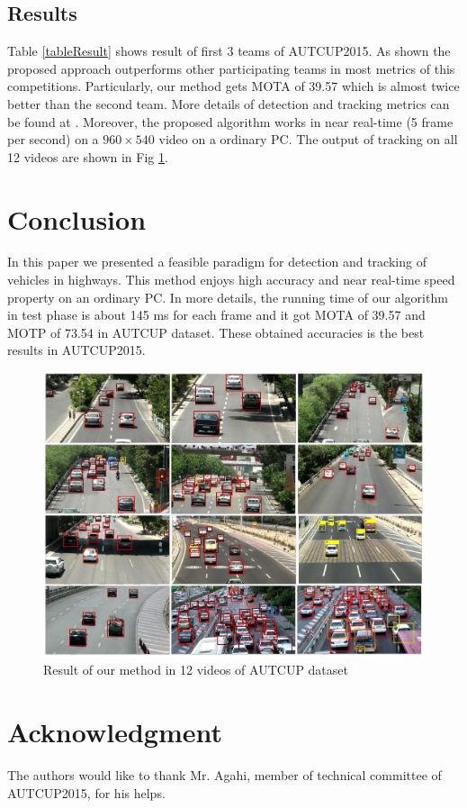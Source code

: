 \documentclass[conference]{IEEEtran}
\begin{document}
\subsection{Results} 
Table \ref{tableResult} shows result of first 3 teams of AUTCUP2015. As shown the proposed approach outperforms other participating teams in most metrics of this competitions. Particularly, our method gets MOTA of 39.57 which is almost twice better than the second team. More details of detection and tracking metrics can be found at \cite{}.
Moreover, the proposed algorithm works in near real-time (5 frame per second) on a $960\times 540$ video on a ordinary PC.
The output of tracking on all 12 videos are shown in Fig \ref{results}. 


\section{Conclusion}
In this paper we presented a feasible paradigm for detection and tracking of vehicles in highways. This method enjoys high accuracy and near real-time speed property on an ordinary PC. In more details, the running time of our algorithm in test phase is about 145 ms for each frame and it got MOTA of 39.57 and MOTP of 73.54 in AUTCUP dataset. These obtained accuracies is the best results in AUTCUP2015.

\begin{figure}[t]
	\centering
	\includegraphics[width=\textwidth]{images/results.jpg}
	\caption{Result of our method in 12 videos of AUTCUP dataset}
	\label{results}
\end{figure}




\section*{Acknowledgment}


The authors would like to thank Mr. Agahi, member of technical committee of AUTCUP2015, for his helps.





\end{document}
